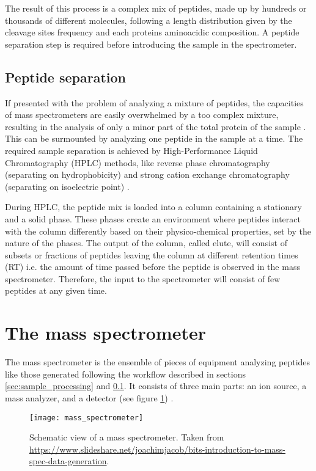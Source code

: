 The result of this process is a complex mix of peptides, made up by hundreds or thousands of different molecules, following a length distribution given by the cleavage sites frequency and each protein\textquotesingle s aminoacidic composition. A peptide separation step is required before introducing the sample in the spectrometer.

\subsection{Peptide separation}
\label{subsec:peptide_separation}

If presented with the problem of analyzing a mixture of peptides, the capacities of mass spectrometers are easily overwhelmed by a too complex mixture, resulting in the analysis of only a minor part of the total protein of the sample \cite{Barsnes2008}. This can be surmounted by analyzing one peptide in the sample at a time. The required sample separation is achieved by High-Performance Liquid Chromatography (\ac{HPLC}) methods, like reverse phase chromatography (separating on hydrophobicity) and strong cation exchange chromatography (separating on isoelectric point) \cite{Barsnes2008}.

During \ac{HPLC}, the peptide mix is loaded into a column containing a stationary and a solid phase. These phases create an environment where peptides interact with the column differently based on their physico-chemical properties, set by the nature of the phases. The output of the column, called elute, will consist of subsets or fractions of peptides leaving the column at different retention times (\ac{RT}) i.e. the amount of time passed before the peptide is observed in the mass spectrometer. Therefore, the input to the spectrometer will consist of few peptides at any given time.

\section{The mass spectrometer}
\label{sec:the_mass_spectrometer}

The mass spectrometer is the ensemble of pieces of equipment analyzing peptides like those generated following the workflow described in sections \ref{sec:sample_processing} and \ref{subsec:peptide_separation}. It consists of three main parts: an ion source, a mass analyzer, and a detector (see figure \ref{fig:mass_spectrometer}) \cite{Barsnes2008}.

\begin{figure}[!h]
\texttt{[image: mass\_spectrometer]}
\caption[Mass spectrometer diagram]{Schematic view of a mass spectrometer. Taken from \href{https://www.slideshare.net/joachimjacob/bits-introduction-to-mass-spec-data-generation}{https://www.slideshare.net/joachimjacob/bits-introduction-to-mass-spec-data-generation}.}
\label{fig:mass_spectrometer}
\end{figure}
%

